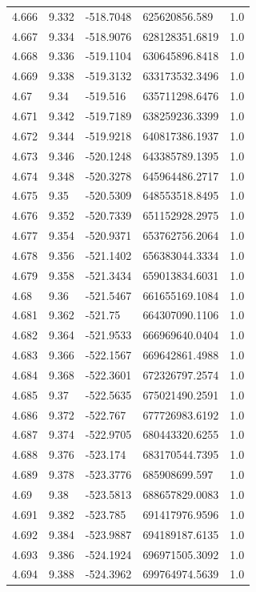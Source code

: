 \begin{tabular}{lllll}
4.666 & 9.332 & -518.7048 & 625620856.589 & 1.0 \\
4.667 & 9.334 & -518.9076 & 628128351.6819 & 1.0 \\
4.668 & 9.336 & -519.1104 & 630645896.8418 & 1.0 \\
4.669 & 9.338 & -519.3132 & 633173532.3496 & 1.0 \\
4.67 & 9.34 & -519.516 & 635711298.6476 & 1.0 \\
4.671 & 9.342 & -519.7189 & 638259236.3399 & 1.0 \\
4.672 & 9.344 & -519.9218 & 640817386.1937 & 1.0 \\
4.673 & 9.346 & -520.1248 & 643385789.1395 & 1.0 \\
4.674 & 9.348 & -520.3278 & 645964486.2717 & 1.0 \\
4.675 & 9.35 & -520.5309 & 648553518.8495 & 1.0 \\
4.676 & 9.352 & -520.7339 & 651152928.2975 & 1.0 \\
4.677 & 9.354 & -520.9371 & 653762756.2064 & 1.0 \\
4.678 & 9.356 & -521.1402 & 656383044.3334 & 1.0 \\
4.679 & 9.358 & -521.3434 & 659013834.6031 & 1.0 \\
4.68 & 9.36 & -521.5467 & 661655169.1084 & 1.0 \\
4.681 & 9.362 & -521.75 & 664307090.1106 & 1.0 \\
4.682 & 9.364 & -521.9533 & 666969640.0404 & 1.0 \\
4.683 & 9.366 & -522.1567 & 669642861.4988 & 1.0 \\
4.684 & 9.368 & -522.3601 & 672326797.2574 & 1.0 \\
4.685 & 9.37 & -522.5635 & 675021490.2591 & 1.0 \\
4.686 & 9.372 & -522.767 & 677726983.6192 & 1.0 \\
4.687 & 9.374 & -522.9705 & 680443320.6255 & 1.0 \\
4.688 & 9.376 & -523.174 & 683170544.7395 & 1.0 \\
4.689 & 9.378 & -523.3776 & 685908699.597 & 1.0 \\
4.69 & 9.38 & -523.5813 & 688657829.0083 & 1.0 \\
4.691 & 9.382 & -523.785 & 691417976.9596 & 1.0 \\
4.692 & 9.384 & -523.9887 & 694189187.6135 & 1.0 \\
4.693 & 9.386 & -524.1924 & 696971505.3092 & 1.0 \\
4.694 & 9.388 & -524.3962 & 699764974.5639 & 1.0 \\

\end{tabular}
